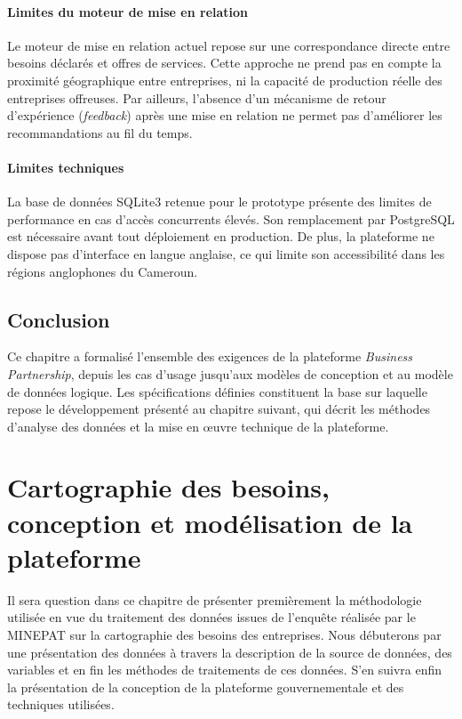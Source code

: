 \documentclass[12pt, a4paper, oneside]{report}
\begin{document}
	\subsubsection{Limites du moteur de mise en relation}
	
	Le moteur de mise en relation actuel repose sur une correspondance
	directe entre besoins d\'eclar\'es et offres de services. Cette
	approche ne prend pas en compte la proximit\'e g\'eographique
	entre entreprises, ni la capacit\'e de production r\'eelle des
	entreprises offreuses. Par ailleurs, l'absence d'un m\'ecanisme
	de retour d'exp\'erience (\textit{feedback}) apr\`es une mise en
	relation ne permet pas d'am\'eliorer les recommandations au fil
	du temps.
	
	\subsubsection{Limites techniques}
	
	La base de donn\'ees SQLite3 retenue pour le prototype pr\'esente
	des limites de performance en cas d'acc\`es concurrents \'elev\'es.
	Son remplacement par PostgreSQL est n\'ecessaire avant tout
	d\'eploiement en production. De plus, la plateforme ne dispose pas
	d'interface en langue anglaise, ce qui limite son accessibilit\'e
	dans les r\'egions anglophones du Cameroun.
	
\section*{Conclusion}
	Ce chapitre a formalis\'e l'ensemble des exigences de la plateforme
	\textit{Business Partnership}, depuis les cas d'usage jusqu'aux
	mod\`eles de conception et au mod\`ele de donn\'ees logique. Les
	sp\'ecifications d\'efinies constituent la base sur laquelle repose
	le d\'eveloppement pr\'esent\'e au chapitre suivant, qui d\'ecrit
	les m\'ethodes d'analyse des donn\'ees et la mise en \oe uvre
	technique de la plateforme.
	
	
	\chapter{Cartographie des besoins, conception et modélisation de la plateforme}
	Il sera question dans ce chapitre de présenter premièrement la méthodologie utilisée en vue du traitement des données issues de  l’enquête réalisée par le MINEPAT sur la cartographie des besoins des entreprises. Nous débuterons par une présentation des données à travers la description de la source de données, des variables et en fin les méthodes de traitements de ces données. S’en suivra enfin la présentation de la conception de la plateforme gouvernementale et des techniques utilisées.
	\label{chap:methodo}
	
\end{document}
